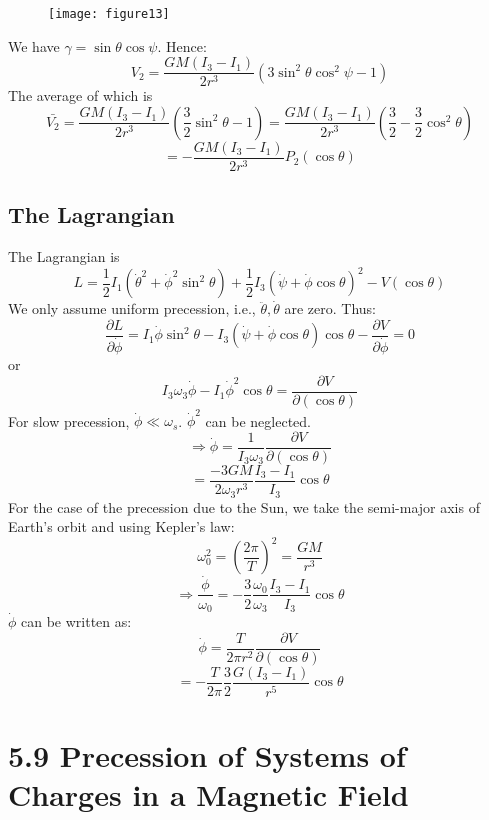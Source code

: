 \documentclass[12pt]{article}
\begin{document}
	\begin{figure}[h]
		\centering
		\texttt{[image: figure13]}
		\caption{}
		\label{fig:figure13}
	\end{figure}
	
	We have $\gamma = \sin\theta \cos\psi$. Hence:
	\[ V_2 = \frac{G M(I_3 - I_1)}{2r^3} (3\sin^2\theta \cos^2\psi - 1) \]
	The average of which is
	\[ \bar{V_2} = \frac{G M(I_3 - I_1)}{2r^3} (\frac{3}{2}\sin^2\theta - 1) = \frac{G M(I_3 - I_1)}{2r^3} (\frac{3}{2} - \frac{3}{2}\cos^2\theta) \]
	\[ = - \frac{G M(I_3 - I_1)}{2r^3} P_2(\cos\theta) \]
	
	\subsection*{The Lagrangian}
	The Lagrangian is
	\[ L = \frac{1}{2} I_1 (\dot{\theta}^2 + \dot{\phi}^2 \sin^2\theta) + \frac{1}{2} I_3 (\dot{\psi} + \dot{\phi}\cos\theta)^2 - V(\cos\theta) \]
	We only assume uniform precession, i.e., $\ddot{\theta}, \dot{\theta}$ are zero. Thus:
	\[ \frac{\partial L}{\partial \dot{\phi}} = I_1 \dot{\phi} \sin^2\theta - I_3(\dot{\psi} + \dot{\phi}\cos\theta)\cos\theta - \frac{\partial V}{\partial \dot{\phi}} = 0 \]
	or
	\[ I_3 \omega_3 \dot{\phi} - I_1 \dot{\phi}^2 \cos\theta = \frac{\partial V}{\partial (\cos\theta)} \]
	For slow precession, $\dot{\phi} \ll \omega_s$. $\dot{\phi}^2$ can be neglected.
	\[ \Rightarrow \dot{\phi} = \frac{1}{I_3 \omega_3} \frac{\partial V}{\partial (\cos\theta)} \]
	\[ = \frac{-3 G M}{2 \omega_3 r^3} \frac{I_3 - I_1}{I_3} \cos\theta \]
	For the case of the precession due to the Sun, we take the semi-major axis of Earth's orbit and using Kepler's law:
	\[ \omega_0^2 = (\frac{2\pi}{T})^2 = \frac{G M}{r^3} \]
	\[ \Rightarrow \frac{\dot{\phi}}{\omega_0} = - \frac{3}{2} \frac{\omega_0}{\omega_3} \frac{I_3 - I_1}{I_3} \cos\theta \]
	$\dot{\phi}$ can be written as:
	\[ \dot{\phi} = \frac{T}{2\pi r^2} \frac{\partial V}{\partial (\cos\theta)} \]
	\[ = - \frac{T}{2\pi} \frac{3}{2} \frac{G(I_3 - I_1)}{r^5} \cos\theta \]
	
	\section*{5.9 Precession of Systems of Charges in a Magnetic Field}
	
\end{document}
